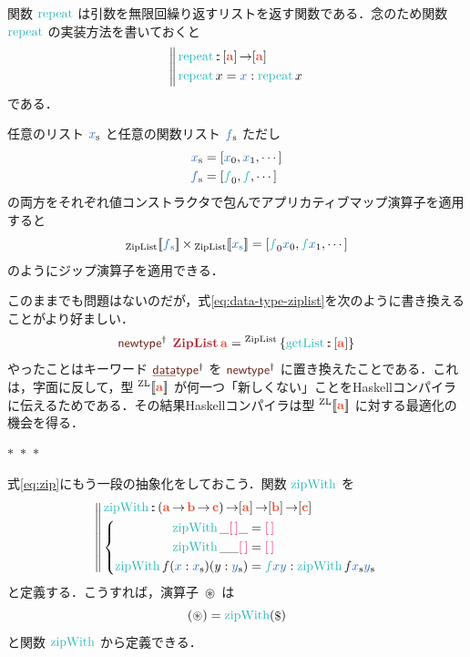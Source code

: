 \documentclass[a5paper,twoside,fleqn,draft]{jsbook}
\def\[{[\![}
\def\]{]\!]}
\def\constantColor{WildStrawberry}
\def\keywordColor{Sepia}
\def\varColor{NavyBlue}
\def\funcColor{BlueGreen}
\def\typeColor{RedOrange}
\def\typeConstColor{Maroon}
\newcommand{\separator}{\begin{center}$*$~$*$~$*$\end{center}}
\newcommand{\programminglanguage}[1]{\textsf{#1}}
\newcommand{\haskell}{\programminglanguage{Haskell}}
\newcommand{\mBrace}{\Vert}
\newcommand{\mKeyword}[1]{\textcolor{\keywordColor}{\mathsf{#1}}}
\newcommand{\mKeywordUnderline}[1]{\textcolor{\keywordColor}{\text{\underline{\textsf{#1}}}}}
\newcommand{\mDataTypeKeyword}{\mKeywordUnderline{data}\mKeyword{type}}
\newcommand{\mNewTypeDeclKeyword}{\mKeyword{newtype}}
\newcommand{\mPolymorphic}[1]{{#1}^\dagger}
\newcommand{\mSpecialTypeConstructor}[1]{\textcolor{\typeConstColor}{\textbf{#1}}}
\DeclareMathOperator{\mDataTypePolymorphic}{\mDataTypeKeyword^\dagger}
\DeclareMathOperator{\mNewTypeDeclPolymorphic}{\mPolymorphic{\mNewTypeDeclKeyword}}
\newcommand{\mEmptyList}{{\textcolor{\constantColor}{[\,]}}}
\newcommand{\mVar}[1]{\textcolor{\varColor}{#1}}
\newcommand{\mXVar}{\mVar{x}}
\newcommand{\mYVar}{\mVar{y}}
\newcommand{\mFunc}[1]{\textcolor{\funcColor}{#1}}
\newcommand{\mSpecialFunc}[1]{\textcolor{\funcColor}{\textrm{#1}}}
\newcommand{\mFFunc}{{\mFunc{f}}}
\DeclareMathOperator{\mGetList}{\mSpecialFunc{getList}}
\DeclareMathOperator{\mRepeat}{\mSpecialFunc{repeat}}
\DeclareMathOperator{\mZipWith}{\mSpecialFunc{zipWith}}
\DeclareMathOperator{\mApply}{\$}
\DeclareMathOperator{\mAppMap}{\times}
\DeclareMathOperator{\mFuncArrow}{\rightarrow}
\DeclareMathOperator{\mIn}{{:\!:}}
\DeclareMathOperator{\mZip}{\circledast}
\newcommand{\mType}[1]{\textcolor{\typeColor}{\mathbf{#1}}}
\newcommand{\mA}{\mType{a}}
\newcommand{\mB}{\mType{b}}
\newcommand{\mC}{\mType{c}}
\newcommand{\mTypeAssemble}[2]{{}^\mathrm{#1}\[\mType{#2}\]}
\newcommand{\mZipListType}[1]{\mTypeAssemble{ZL}{#1}}
\DeclareMathOperator{\mZipListTypeConstructor}{\mSpecialTypeConstructor{ZipList}}
\newcommand{\mValueConstructor}[1]{\mathrm{#1}}
\newcommand{\mValueWith}[2]{{}_\mValueConstructor{#1}\[\mVar{#2}\]}
\newcommand{\mValueRecordBeginWith}[1]{{}^\mValueConstructor{#1}\,\{}
\newcommand{\mValueRecordEnd}{\}}
\newcommand{\mValueRecordWith}[2]{\mValueRecordBeginWith{#1}{#2}\mValueRecordEnd}
\newcommand{\mZipListWith}[1]{\mValueWith{ZipList}{#1}}
\newcommand{\mZipListRecordWith}[1]{\mValueRecordWith{ZipList}{#1}}
\newcommand{\mList}[1]{\mVar{#1}_\mathrm{s}}
\newcommand{\mProjEXP}[2]{#1\mFuncArrow#2} %
\begin{document}
関数 $\mRepeat$ は引数を無限回繰り返すリストを返す関数である．念のため関数 $\mRepeat$ の実装方法を書いておくと
\begin{equation}
  \left\mBrace
  \begin{aligned}
    &\mRepeat\mIn{}\mProjEXP{[\mA]}{[\mA]}\\
    &\mRepeat x=\mXVar:\mRepeat x
  \end{aligned}
  \right.
\end{equation}
である．

任意のリスト $\mList{x}$ と任意の関数リスト $\mList{f}$ ただし
\begin{align}
\mList{x}&=[\mXVar_0,\mXVar_1,\dotsb]\\
\mList{f}&=[\mFFunc_0,\mFFunc,\dotsb]
\end{align}
の両方をそれぞれ値コンストラクタで包んでアプリカティブマップ演算子を適用すると
\begin{equation}
  \mZipListWith{\mList{f}}\mAppMap\mZipListWith{\mList{x}}
  =[\mFFunc_0\mXVar_0,\mFFunc \mXVar_1,\dotsb]
\end{equation}
のようにジップ演算子を適用できる．

このままでも問題はないのだが，式\eqref{eq:data-type-ziplist}を次のように書き換えることがより好ましい．
\begin{equation}
  \mNewTypeDeclPolymorphic\;
  \mZipListTypeConstructor\mA
  =\mZipListRecordWith{\mGetList\mIn{}[\mA]}
\end{equation}
やったことはキーワード $\mDataTypePolymorphic$ を
$\mNewTypeDeclPolymorphic$ に置き換えたことである．これは，字面に反して，型 $\mZipListType{a}$ が何一つ「新しくない」ことを\haskell コンパイラに伝えるためである．その結果\haskell コンパイラは型 $\mZipListType{a}$ に対する最適化の機会を得る．

\separator

式\eqref{eq:zip}にもう一段の抽象化をしておこう．関数 $\mZipWith$ を
\begin{equation}
  \left\mBrace
  \begin{aligned}
    {}&\mZipWith\mIn{}\mProjEXP{\mProjEXP{\mProjEXP{(\mProjEXP{\mA }
          {\mProjEXP{\mB }{\mC }})}
        {[\mA]}}{[\mB]}}{[\mC]}\\
    {}&\left\{\begin{aligned}
    \mZipWith\_\mEmptyList\_
    &=\mEmptyList\\
    \mZipWith\_\_\mEmptyList
    &=\mEmptyList\\
    \mZipWith f(\mXVar:\mList{x})(y:\mList{y})
    &=\mFFunc\mXVar\mYVar:\mZipWith f\mList{x}\mList{y}
    \end{aligned}
    \right.
  \end{aligned}
  \right.
\end{equation}
と定義する．こうすれば，演算子 $\mZip$ は
\begin{equation}
  (\mZip)
  =\mZipWith(\mApply)
\end{equation}
と関数 $\mZipWith$ から定義できる．
\end{document}
